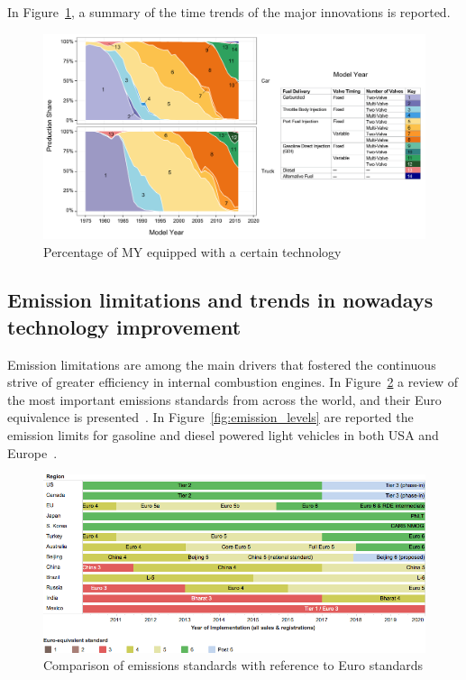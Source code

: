 In Figure~\ref{fig:technology_trends}, a summary of the time trends of the major innovations is reported.

\begin{figure}[ht]
  \centering  \includegraphics[width=\textwidth]{figures/review/technology_trends.png}
  \caption{Percentage of MY equipped with a certain technology  \label{fig:technology_trends} }
\end{figure}


\subsection{Emission limitations and trends in nowadays technology improvement}
\label{sec:technology_improvements}

Emission limitations are among the main drivers that fostered the continuous strive of greater efficiency in internal combustion engines. In Figure~\ref{fig:emission_standards} a review of the most important emissions standards from across the world, and their Euro equivalence is presented~\cite{Miller2014}. In Figure~\ref{fig:emission_levels} are reported the emission limits for gasoline and diesel powered light vehicles in both USA and Europe~\cite{Transportpolicy.net2016}.

\begin{figure}[ht]
  \centering
  \includegraphics[width=\textwidth]{figures/review/emission_standards.png}
  \caption{Comparison of emissions standards with reference to Euro standards\label{fig:emission_standards} }
\end{figure}

